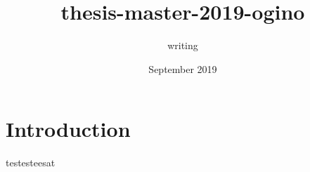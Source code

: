 \documentclass{article}
\title{thesis-master-2019-ogino}
\author{writing }
\date{September 2019}
\begin{document}
\maketitle

\section{Introduction}

testesteesat
\end{document}
